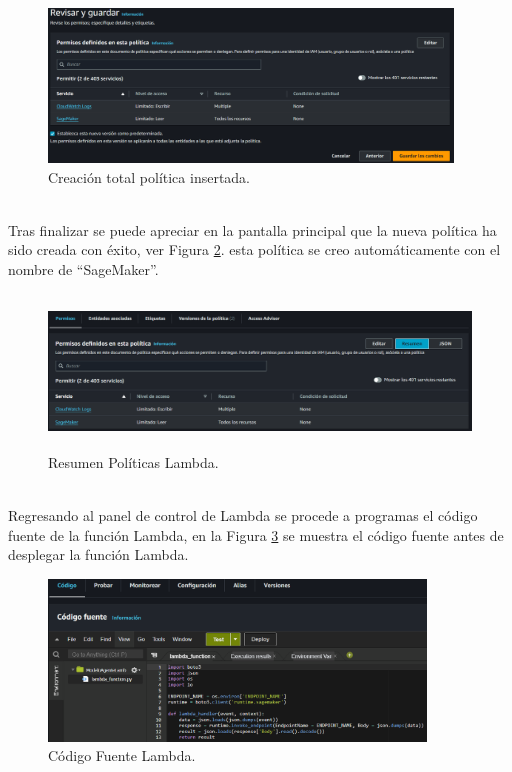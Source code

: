 \documentclass[a4paper,10pt, oneside, titlepage]{article}
\begin{document}
	\begin{figure}[!h]
		\centering
		\includegraphics[width = 1\linewidth, height = 4.1cm]{Fin_Politica_Lambda.png}
		\caption{Creación total política insertada.}
		\label{Fin_Politica_Lambda}
	\end{figure} \\
	\indent Tras finalizar se puede apreciar en la pantalla principal que la nueva política ha sido creada con éxito, ver Figura \ref{Resumen_Politica_Lambda}. esta política se creo automáticamente con el nombre de ``SageMaker''.
	\begin{figure}[!h]
		\centering
		\includegraphics[width = 1\linewidth, height = 4.1cm]{Resumen_Politica_Lambda.png}
		\caption{Resumen Políticas Lambda.}
		\label{Resumen_Politica_Lambda}
	\end{figure} \\
	\indent Regresando al panel de control de Lambda se procede a programas el código fuente de la función Lambda, en la Figura \ref{Codigo_Fuente_Lambda} se muestra el código fuente antes de desplegar la función Lambda.
	\begin{figure}[!h]
		\centering
		\includegraphics[width = 1\linewidth, height = 4.3cm]{Codigo_Fuente_Lambda.png}
		\caption{Código Fuente Lambda.}
		\label{Codigo_Fuente_Lambda}
	\end{figure} \\
\end{document}
